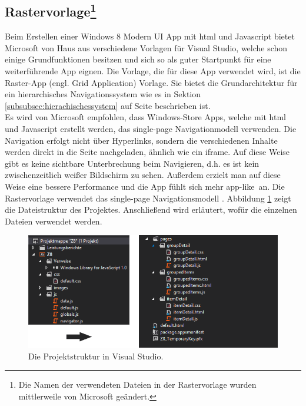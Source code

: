 \documentclass[12pt,a4paper,bibtotoc,abstracton]{scrartcl}
\begin{document}
\subsection[Rastervorlage] {Rastervorlage\footnote{Die Namen der verwendeten Dateien in der Rastervorlage wurden mittlerweile von Microsoft geändert.}}
\label{subsec:rastervorlage}
Beim Erstellen einer Windows 8 Modern UI App mit \ac{html} und Javascript bietet Microsoft von Haus aus verschiedene Vorlagen für Visual Studio, welche schon einige Grundfunktionen besitzen und sich so als guter Startpunkt für eine weiterführende App eignen. Die Vorlage, die für diese App verwendet wird, ist die Raster-App (engl. Grid Application) Vorlage. Sie bietet die Grundarchitektur für ein hierarchisches Navigationssystem wie es in Sektion \ref{subsubsec:hierachischessystem} auf Seite \pageref{subsubsec:hierachischessystem} beschrieben ist.\\
Es wird von Microsoft empfohlen, dass Windows-Store Apps, welche mit \ac{html} und Javascript erstellt werden, das single-page Navigationmodell verwenden. Die Navigation erfolgt nicht über Hyperlinks, sondern die verschiedenen Inhalte werden direkt in die Seite nachgeladen, ähnlich wie ein iframe. Auf diese Weise gibt es keine sichtbare Unterbrechung beim Navigieren, d.h. es ist kein zwischenzeitlich weißer Bildschirm zu sehen. Außerdem erzielt man auf diese Weise eine bessere Performance und die App fühlt sich mehr \glqq app-like\grqq\ an. Die Rastervorlage verwendet das single-page Navigationsmodell \citep{MicrosoftSinglePage2013}. Abbildung \ref{fig:projektmappe} zeigt die Dateistruktur des Projektes. Anschließend wird erläutert, wofür die einzelnen Dateien verwendet werden.

\begin{figure}[h]
	\centering
	\includegraphics[width=\textwidth]{Bilder/Screenshots/app/projektmappe.png} 
	\caption{Die Projektstruktur in Visual Studio.}
	\label{fig:projektmappe}
\end{figure}
\end{document}
